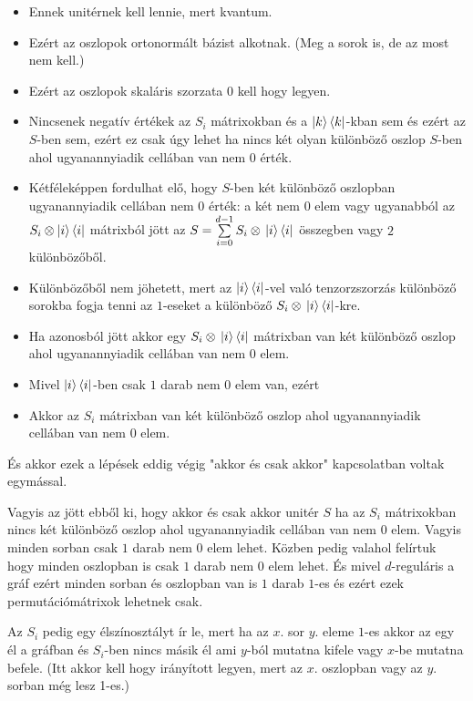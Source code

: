 \begin{itemize}
\item Ennek unitérnek kell lennie, mert kvantum.
\item Ezért az oszlopok ortonormált bázist alkotnak. (Meg a sorok is, de az most nem kell.)
\item Ezért az oszlopok skaláris szorzata 0 kell hogy legyen.
\item Nincsenek negatív értékek az $S_i$ mátrixokban és a $\ket{k}\bra{k}$-kban sem és ezért az $S$-ben sem, ezért ez csak úgy lehet ha nincs két olyan különböző oszlop $S$-ben ahol ugyanannyiadik cellában van nem $0$ érték.
\item Kétféleképpen fordulhat elő, hogy $S$-ben két különböző oszlopban ugyanannyiadik cellában nem $0$ érték: a két nem $0$ elem vagy ugyanabból az $S_i \otimes \ket{i}\bra{i}$  mátrixból jött az  $S = \sum\limits_{i=0}^{d-1} S_i \otimes{} \ket{i}\bra{i}$ összegben vagy $2$ különbözőből.
\item Különbözőből nem jöhetett, mert az $\ket{i}\bra{i}$-vel való tenzorzszorzás különböző sorokba fogja tenni az $1$-eseket a különböző $S_i \otimes{}\ket{i}\bra{i}$-kre.
\item Ha azonosból jött akkor egy $S_i \otimes{} \ket{i}\bra{i}$  mátrixban van két különböző oszlop ahol ugyanannyiadik cellában van nem $0$ elem.
\item Mivel $\ket{i}\bra{i}$-ben csak $1$ darab nem $0$ elem van, ezért
\item Akkor az $S_i$ mátrixban van két különböző oszlop ahol ugyanannyiadik cellában van nem $0$ elem.
\end{itemize}

És akkor ezek a lépések eddig végig "akkor és csak akkor" kapcsolatban voltak egymással.


Vagyis az jött ebből ki, hogy akkor és csak akkor unitér $S$ ha az $S_i$ mátrixokban nincs két különböző oszlop ahol ugyanannyiadik cellában van nem $0$ elem. Vagyis minden sorban csak $1$ darab nem $0$ elem lehet. Közben pedig valahol felírtuk hogy minden oszlopban is csak $1$ darab nem $0$ elem lehet. És mivel $d$-reguláris a gráf ezért minden sorban és oszlopban van is $1$ darab $1$-es és ezért ezek permutációmátrixok lehetnek csak.

Az $S_i$ pedig egy élszínosztályt ír le, mert ha az $x.$ sor $y.$ eleme $1$-es akkor az egy él a gráfban és $S_i$-ben nincs másik él ami $y$-ból mutatna kifele vagy $x$-be mutatna befele. (Itt akkor kell hogy irányított legyen, mert az $x.$ oszlopban vagy az $y.$ sorban még lesz 1-es.)

